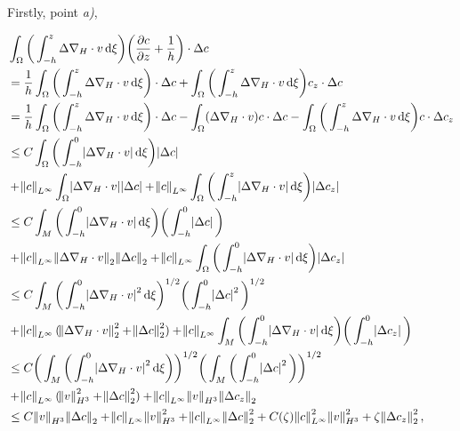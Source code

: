 \documentclass[11pt]{article}
\newcommand*\diff{\mathop{}\!\mathrm{d}}
\begin{document}
\begin{enumerate}
Firstly, point \textit{a)},

\begin{equation}
  \begin{split}
    &  \int_\Omega \bigg ( \int_{-h}^z \Delta \nabla_H \cdot v \diff \xi \bigg) \bigg ( \frac{\partial c}{\partial z} + \frac{1}{h}\bigg)  \cdot \Delta c \\
    & = \frac{1}{h} \int_\Omega \bigg ( \int_{-h}^z \Delta \nabla_H \cdot v \diff \xi \bigg) \cdot \Delta c + \int_\Omega \bigg ( \int_{-h}^z \Delta \nabla_H \cdot v \diff \xi \bigg) c_z \cdot \Delta c \\
    & = \frac{1}{h} \int_\Omega \bigg ( \int_{-h}^z \Delta \nabla_H \cdot v \diff \xi \bigg) \cdot \Delta c - \int_\Omega  (\Delta \nabla_H \cdot v) c \cdot \Delta c - \int_\Omega \bigg ( \int_{-h}^z \Delta \nabla_H \cdot v \diff \xi \bigg) c \cdot \Delta c_z \\
    & \leq C \int_\Omega \bigg ( \int_{-h}^0 \abs{\Delta \nabla_H \cdot v} \diff \xi \bigg) \abs{\Delta c} \\
    & + \norm{c}_{L^\infty} \int_\Omega  \abs{\Delta \nabla_H \cdot v} \abs{\Delta c} + \norm{c}_{L^\infty} \int_\Omega \bigg ( \int_{-h}^z \abs{ \Delta \nabla_H \cdot v} \diff \xi \bigg) \abs{\Delta c_z} \\
    & \leq C \int_M \bigg ( \int_{-h}^0 \abs{\Delta \nabla_H \cdot v} \diff \xi \bigg) \bigg ( \int_{-h}^0 \abs{\Delta c} \bigg ) \\
    & + \norm{c}_{L^\infty}   \norm{\Delta \nabla_H \cdot v}_2 \norm{\Delta c}_2 + \norm{c}_{L^\infty} \int_\Omega \bigg ( \int_{-h}^0 \abs{ \Delta \nabla_H \cdot v} \diff \xi \bigg) \abs{\Delta c_z} \\
    & \leq C \int_M \bigg ( \int_{-h}^0 \abs{\Delta \nabla_H \cdot v}^2 \diff \xi \bigg)^{1/2}  \bigg ( \int_{-h}^0 \abs{\Delta c}^2 \bigg )^{1/2} \\
    & + \norm{c}_{L^\infty} (\norm{\Delta \nabla_H \cdot v}_2^2 + \norm{\Delta c}_2^2) + \norm{c}_{L^\infty} \int_M \bigg ( \int_{-h}^0 \abs{ \Delta \nabla_H \cdot v} \diff \xi \bigg) \bigg ( \int_{-h}^0 \abs{\Delta c_z} \bigg) \\
    & \leq C \bigg ( \int_M \bigg ( \int_{-h}^0 \abs{\Delta \nabla_H \cdot v}^2 \diff \xi \bigg) \bigg )^{1/2} \bigg ( \int_M \bigg ( \int_{-h}^0 \abs{\Delta c}^2 \bigg ) \bigg )^{1/2} \\
    & + \norm{c}_{L^\infty} (\norm{v}_{H^3}^2 + \norm{\Delta c}_2^2) + \norm{c}_{L^\infty} \norm{v}_{H^3} \norm{\Delta c_z}_2 \\
    & \leq C \norm{v}_{H^3} \norm{\Delta c}_2 + \norm{c}_{L^\infty} \norm{v}_{H^3}^2 + \norm{c}_{L^\infty} \norm{\Delta c}_2^2 + C(\zeta) \norm{c}_{L^\infty}^2 \norm{v}_{H^3}^2 + \zeta \norm{\Delta c_z}_2^2, \\
  \end{split}
\end{equation}


\end{enumerate}
\end{document}
